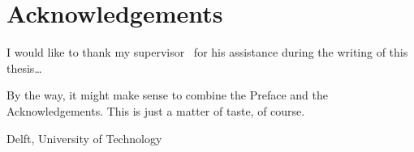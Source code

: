 %
\chapter{Acknowledgements}%

I would like to thank my supervisor \mscreaderone\ for his assistance during the writing of this thesis\ldots

By the way, it might make sense to combine the Preface and the Acknowledgements.  This is just a matter of taste, of course.

\vspace*{15mm}

Delft, University of Technology \hfill \mscname \\
\mscdate